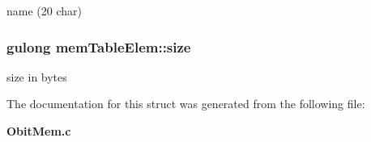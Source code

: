 name (20 char) 

\subsubsection{\setlength{\rightskip}{0pt plus 5cm}gulong {\bf mem\-Table\-Elem::size}}\label{structmemTableElem_o1}


size in bytes 



The documentation for this struct was generated from the following file:\begin{CompactItemize}
\item 
{\bf Obit\-Mem.c}\end{CompactItemize}
